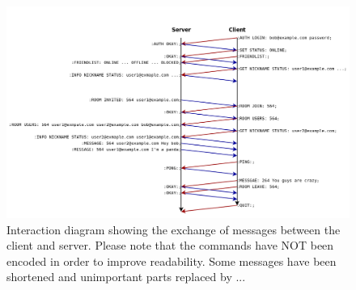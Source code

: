 \newpage
\begin{landscape}
    \begin{figure}
        \begin{center}
            \includegraphics[scale=0.60]{Design/diagrams/protocol_interaction.png}
            \caption{Interaction diagram showing the exchange of messages between the client and server. Please note that the commands have NOT been encoded in order to improve readability. Some messages have been shortened and unimportant parts replaced by ...}
            \label{interactionDia}
        \end{center}
    \end{figure}
\end{landscape}

